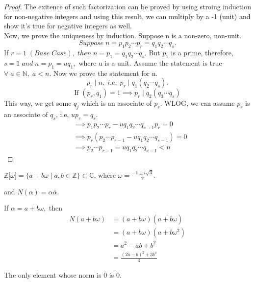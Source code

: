\documentclass[10pt,a4paper]{article}
\begin{document}
\begin{proof}
The exitence of such factorization can be proved by using stroing induction for non-negative integers and using this result, we can multiply by a -1 (unit) and show it's true for negative integers as well. \\
Now, we prove the uniqueness by induction. Suppose n is a non-zero, non-unit.$$Suppose\;n = p_{1}p_{2}{\cdots}p_{r} = q_{1}q_{2}{\cdots}q_{s}.$$
If $r = 1\;(Base\;Case),\;then\; n = p_{1} = q_{1}q_{2}{\cdots}q_{s}$. But $p_{1}$ is a prime, therefore, $s=1\;and\;n=p_{1}=uq_{1},$ where u is a unit. Assume the statement is true $\forall\;a\in\mathbb{N},\;a<n$. Now we prove the statement for n. $$p_{r}\mid n,\;i.e,\; p_{r}\mid q_{1}(q_{2}{\cdots}q_{s}).$$
$$\text{If }(p_{r},q_{1})=1\implies p_{r}\mid q_{2}(q_{3}{\cdots}q_{s})$$
This way, we get some $q_{j}$ which is an associate of $p_{r}$. WLOG, we can assume $p_{r}$ is an associate of $q_{s}$, i.e, $up_{r} = q_{s}.$
\begin{align*}
&\implies p_{1}p_{2}{\cdots}p_{r} - uq_{1}q_{2}{\cdots}q_{s-1}p_{r}=0 \\
&\implies p_r(p_{2}{\cdots}p_{r-1} - uq_{1}q_{2}{\cdots}q_{s-1}) = 0 \\
&\implies p_{2}{\cdots}p_{r-1} = uq_{1}q_{2}{\cdots}q_{s-1} < n
\end{align*}
\end{proof}

\begin{definition}
$\mathbb{Z}\lbrack\omega\rbrack = \{a+b\omega\mid a,b\in \mathbb{Z}\} \subset \mathbb{C}$, where $\omega  = \frac{-1\pm i\sqrt{3}}{2}$.
\begin{center}
and $N(\alpha) = {\alpha}\bar{\alpha}.$ \\
\end{center}
\end{definition}

\begin{remark}
If $\alpha = a+b\omega,$ then 
\begin{align*}
N(a+b\omega) &= (a+b\omega)(\overline{a+b\omega}) \\
&= (a+b\omega)(a+b{\omega}^{2}) \\
&= a^2 - ab + b^2 \\
&= \frac{(2a-b)^2+3{b^2}}{4}
\end{align*}
\end{remark}

\begin{remark}
The only element whose norm is 0 is 0.
\end{remark}
\end{document}
